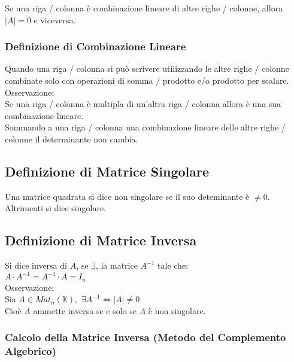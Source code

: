 \documentclass[a4paper, twoside, italian, 11pt]{book}
\newcommand{\K}{\mathbb{K}}
\begin{document}
\noindent
Se una riga / colonna è combinazione lineare di altre righe / colonne, allora $\left | A \right | = 0$ e viceversa.


\subsubsection{Definizione di Combinazione Lineare}

Quando una riga / colonna si può scrivere utilizzando le altre righe / colonne combinate solo con operazioni di somma / prodotto e/o prodotto per scalare. \\

\noindent
Osservazione: \\
Se una riga / colonna è multipla di un'altra riga / colonna allora è una sua combinazione lineare. \\

\noindent
Sommando a una riga / colonna una combinazione lineare delle altre righe / colonne il determinante non cambia. \\


\subsection{Definizione di Matrice Singolare}
Una matrice quadrata si dice non singolare se il suo deteminante è $\neq 0$. Altrimenti si dice singolare.


\subsection{Definizione di Matrice Inversa}

Si dice inversa di $A$, se $\exists$, la matrice $A^{-1}$ tale che: \\

\noindent
$A \cdot A^{-1} = A^{-1} \cdot A = I_n$ \\

\noindent
Osservazione: \\
Sia $A \in Mat_n(\K),$ $\exists A^{-1} \iff \left | A \right | \neq 0$ \\

\noindent
Cioè $A$ ammette inversa se e solo se $A$ è non singolare.


\subsubsection{Calcolo della Matrice Inversa (Metodo del Complemento Algebrico)}
\end{document}
